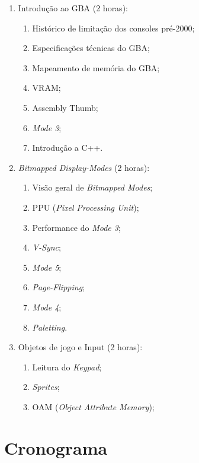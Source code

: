 \documentclass{article}
\begin{document}
\begin{enumerate}
    \item Introdução ao GBA (2 horas):
        \begin{enumerate}
            \item Histórico de limitação dos consoles pré-2000;
            \item Especificações técnicas do GBA\@;
            \item Mapeamento de memória do GBA\@;
            \item VRAM\@;
            \item Assembly Thumb;
            \item \textit{Mode 3};
            \item Introdução a C++.
        \end{enumerate}
    \item \textit{Bitmapped Display-Modes} (2 horas):
        \begin{enumerate}
            \item Visão geral de \textit{Bitmapped Modes};
            \item PPU (\textit{Pixel Processing Unit});
            \item Performance do \textit{Mode 3};
            \item \textit{V-Sync};
            \item \textit{Mode 5};
            \item \textit{Page-Flipping};
            \item \textit{Mode 4};
            \item \textit{Paletting}.
        \end{enumerate}
    \item Objetos de jogo e Input (2 horas):
        \begin{enumerate}
            \item Leitura do \textit{Keypad};
            \item \textit{Sprites};
            \item OAM (\textit{Object Attribute Memory});
        \end{enumerate}
\end{enumerate}

\section{Cronograma}
\end{document}
